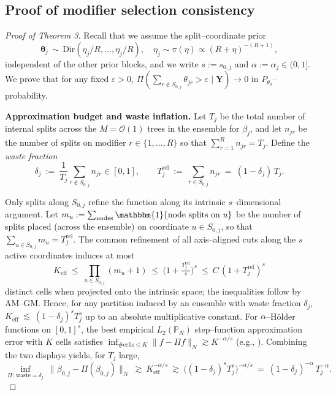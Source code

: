 \documentclass[11pt]{article}
\theoremstyle{plain}
\theoremstyle{definition}
\theoremstyle{plain}
\begin{document}
\subsection{Proof of modifier selection consistency}
\label{sec:proof_modifier}
\begin{proof}[Proof of Theorem 3]
Recall that we assume the split–coordinate prior
\[
\boldsymbol \theta_j \,\sim\, \mathrm{Dir}\!\left({\eta_j}/{R},\dots,{\eta_j}/{R}\right),
\quad 
\eta_j \sim \pi(\eta)\propto (R+\eta)^{-(R+1)},
\]
independent of the other prior blocks, and we write $s:=s_{0,j}$ and $\alpha:=\alpha_j\in(0,1]$.
We prove that for any fixed $\varepsilon>0$,
\(
\Pi(\sum_{r\notin S_{0,j}}\theta_{jr}>\varepsilon\mid \bm Y)\to 0
\)
in $P_{\theta_0}$–probability.

\medskip\noindent
\textbf{Approximation budget and waste inflation.}
Let $T_j$ be the total number of internal splits across the $M=\mathcal O(1)$ trees in the ensemble for $\beta_j$,
and let $n_{jr}$ be the number of splits on modifier $r\in\{1,\dots,R\}$ so that $\sum_{r=1}^R n_{jr}=T_j$.
Define the \emph{waste fraction}
\[
\delta_j \ :=\ \frac{1}{T_j}\sum_{r\notin S_{0,j}} n_{jr}\in[0,1],
\qquad
T_j^{\mathrm{rel}}\ :=\ \sum_{r\in S_{0,j}} n_{jr} \ =\ (1-\delta_j)\,T_j.
\]

Only splits along $S_{0,j}$ refine the function along its intrinsic $s$–dimensional argument.
Let $m_u:=\sum_{\text{nodes}}\mathbbm{1}\{\text{node splits on }u\}$ be the number of splits placed (across the ensemble)
on coordinate $u\in S_{0,j}$, so that $\sum_{u\in S_{0,j}} m_u=T_j^{\mathrm{rel}}$.
The common refinement of all axis–aligned cuts along the $s$ active coordinates induces at most
\[
K_{\mathrm{eff}}\ \le\ \prod_{u\in S_{0,j}} (m_u+1)\ \le\ \Big(1+\tfrac{T_j^{\mathrm{rel}}}{s}\Big)^s
\ \le\ C\,(1+T_j^{\mathrm{rel}})^s
\]
distinct cells when projected onto the intrinsic space; the inequalities follow by AM–GM.
Hence, for any partition induced by an ensemble with waste fraction $\delta_j$,
\(
K_{\mathrm{eff}}\ \lesssim\ (1-\delta_j)^s T_j^s
\)
up to an absolute multiplicative constant.
For $\alpha$–H\"older functions on $[0,1]^s$, the best empirical $L_2(\mathbb P_N)$ step–function
approximation error with $K$ cells satisfies
\(
\inf_{\#\text{cells}\le K}\|f-\Pi f\|_N \gtrsim K^{-\alpha/s}
\)
(e.g., \citet{Davydov2010}).
Combining the two displays yields, for $T_j$ large,
\begin{equation}\label{eq:inflation-correct}
\inf_{\Pi:\,\text{waste}=\delta_j}\ \big\|\beta_{0,j}-\Pi(\beta_{0,j})\big\|_N
\ \gtrsim\ K_{\mathrm{eff}}^{-\alpha/s}
\ \gtrsim\ \big((1-\delta_j)^s T_j^s\big)^{-\alpha/s}
\ =\ (1-\delta_j)^{-\alpha}\,T_j^{-\alpha}.
\end{equation}


\end{proof}
\end{document}
